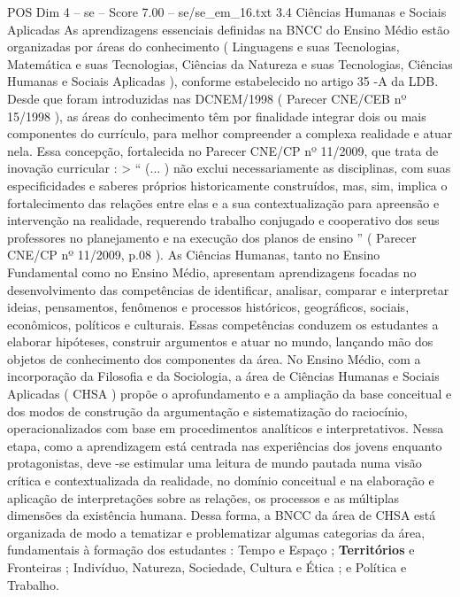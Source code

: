 \begin{textsample}{POS Dim 4 – se – Score 7.00 – se/se\_em\_16.txt}  \label{ex:f4_pos_148}
3.4 Ciências Humanas e Sociais Aplicadas As aprendizagens essenciais definidas na BNCC do Ensino Médio estão organizadas por áreas do conhecimento ( Linguagens e suas Tecnologias, Matemática e suas Tecnologias, Ciências da Natureza e suas Tecnologias, Ciências Humanas e Sociais Aplicadas ), conforme estabelecido no artigo 35 -A da LDB.
Desde que foram introduzidas nas DCNEM/1998 ( Parecer CNE/CEB nº 15/1998 ), as áreas do conhecimento têm por finalidade integrar dois ou mais componentes do currículo, para melhor compreender a complexa realidade e atuar nela.
Essa concepção, fortalecida no Parecer CNE/CP nº 11/2009, que trata de inovação curricular : > “ (... ) não exclui necessariamente as disciplinas, com suas especificidades e saberes próprios historicamente construídos, mas, sim, implica o fortalecimento das relações entre elas e a sua contextualização para apreensão e intervenção na realidade, requerendo trabalho conjugado e cooperativo dos seus professores no planejamento e na execução dos planos de ensino ” ( Parecer CNE/CP nº 11/2009, p.08 ).
As Ciências Humanas, tanto no Ensino Fundamental como no Ensino Médio, apresentam aprendizagens focadas no desenvolvimento das competências de identificar, analisar, comparar e interpretar ideias, pensamentos, fenômenos e processos históricos, geográficos, sociais, econômicos, políticos e culturais.
Essas competências conduzem os estudantes a elaborar hipóteses, construir argumentos e atuar no mundo, lançando mão dos objetos de conhecimento dos componentes da área.
No Ensino Médio, com a incorporação da Filosofia e da Sociologia, a área de Ciências Humanas e Sociais Aplicadas ( CHSA ) propõe o aprofundamento e a ampliação da base conceitual e dos modos de construção da argumentação e sistematização do raciocínio, operacionalizados com base em procedimentos analíticos e interpretativos.
Nessa etapa, como a aprendizagem está centrada nas experiências dos jovens enquanto protagonistas, deve -se estimular uma leitura de mundo pautada numa visão crítica e contextualizada da realidade, no domínio conceitual e na elaboração e aplicação de interpretações sobre as relações, os processos e as múltiplas dimensões da existência humana.
Dessa forma, a BNCC da área de CHSA está organizada de modo a tematizar e problematizar algumas categorias da área, fundamentais à formação dos estudantes : Tempo e Espaço ; \textbf{Territórios} e Fronteiras ; Indivíduo, Natureza, Sociedade, Cultura e Ética ; e Política e Trabalho.

\end{textsample}
